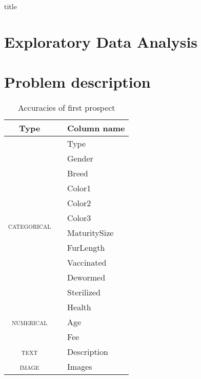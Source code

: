 \documentclass[12pt]{article}
\begin{document}
{title}


\tableofcontents
\listoffigures
\listoftables

{}

\section{Exploratory Data Analysis}
\section{Problem description}

\begin{table}[h!]
    \centering
    \begin{tabular}{ccl}
        \toprule
        \textbf{Type}                 && \multicolumn{1}{c}{\textbf{Column name}} \\ \midrule
        \multirow{12}{*}{\textsc{categorical}} && Type          \\
                                      && Gender        \\
                                      && Breed         \\
                                      && Color1        \\
                                      && Color2        \\
                                      && Color3        \\
                                      && MaturitySize  \\
                                      && FurLength     \\
                                      && Vaccinated    \\
                                      && Dewormed      \\
                                      && Sterilized    \\
                                      && Health        \\ \midrule
        \textsc{numerical}                     && Age           \\
                                      && Fee           \\ \midrule
        \textsc{text}                          && Description   \\ \midrule
        \textsc{image}                         && Images        \\ \bottomrule
    \end{tabular}
    \caption{Accuracies of first prospect}
\end{table}
\end{document}
